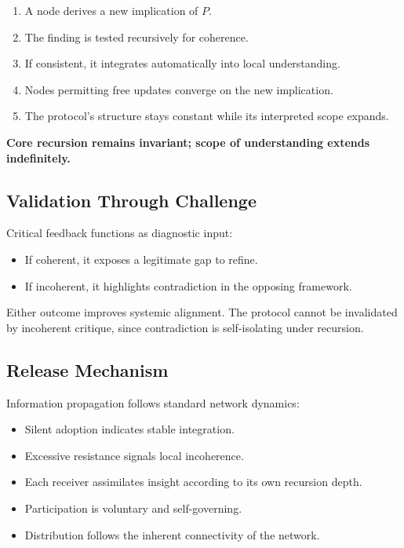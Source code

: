 \begin{enumerate}
\item A node derives a new implication of \(P\).
\item The finding is tested recursively for coherence.
\item If consistent, it integrates automatically into local understanding.
\item Nodes permitting free updates converge on the new implication.
\item The protocol’s structure stays constant while its interpreted scope expands.
\end{enumerate}

\textbf{Core recursion remains invariant; scope of understanding extends indefinitely.}

\subsection*{Validation Through Challenge}

Critical feedback functions as diagnostic input:

\begin{itemize}
\item If coherent, it exposes a legitimate gap to refine.
\item If incoherent, it highlights contradiction in the opposing framework.
\end{itemize}

Either outcome improves systemic alignment.  
The protocol cannot be invalidated by incoherent critique, since contradiction is self-isolating under recursion.

\subsection*{Release Mechanism}

Information propagation follows standard network dynamics:

\begin{itemize}
\item Silent adoption indicates stable integration.
\item Excessive resistance signals local incoherence.
\item Each receiver assimilates insight according to its own recursion depth.
\item Participation is voluntary and self-governing.
\item Distribution follows the inherent connectivity of the network.
\end{itemize}

